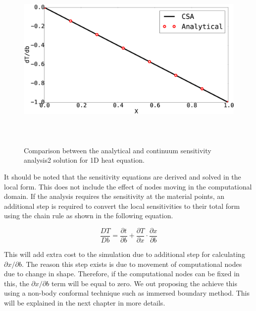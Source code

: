 \begin{figure}[h]
	\centering
	\includegraphics[height=9.00cm]{Chapter_2/figure/SA_CSA_vs_analytical.eps}
	\caption{Comparison between the analytical and continuum sensitivity analysis2 solution for 1D heat equation.}
	\label{fig:C2_verificationOfSolver}
\end{figure}

It should be noted that the sensitivity equations are derived and solved in the local form. This does not include the effect of nodes moving in the computational domain. If the analysis requires the sensitivity at the material points, an additional step is required to convert the local sensitivities to their total form using the chain rule as shown in the following equation.

\begin{equation*}
	\frac{DT}{Db} = \frac{\partial t}{\partial b} + \frac{\partial T}{\partial x} \cdot \frac{\partial x}{\partial b}
\end{equation*}

This will add extra cost to the simulation due to additional step for calculating $\partial x/\partial b$. The reason this step exists is due to movement of computational nodes due to change in shape. Therefore, if the computational nodes can be fixed in this, the $\partial x/\partial b$ term will be equal to zero. We out proposing the achieve this using a non-body conformal technique such as immersed boundary method. This will be explained in the next chapter in more details.

